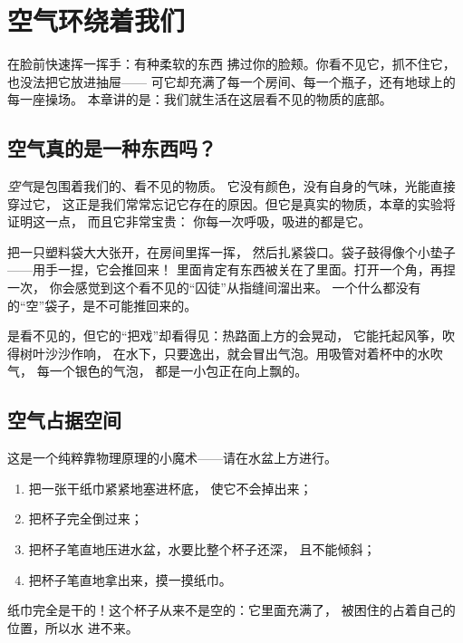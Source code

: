 \chapter{空气环绕着我们}\label{ch:g2:air-around-us}

在脸前快速挥一挥手：有种柔软的东西
拂过你的脸颊。你看不见它，抓不住它，也没法把它放进抽屉——
可它却充满了每一个房间、每一个瓶子，还有地球上的每一座操场。
本章讲的是：我们就生活在这层看不见的物质的底部。

\section{空气真的是一种东西吗？}

\begin{definition}[空气]\label{def:g2:air-around-us:air}
\emph{空气}是包围着我们的、看不见的物质。
它没有颜色，没有自身的气味，光能直接穿过它，
这正是我们常常忘记它存在的原因。但它是真实的物质，本章的实验将证明这一点，
而且它非常宝贵：
你每一次呼吸，吸进的都是它。
\end{definition}

\begin{example}\label{ex:g2:air-around-us:catch}
把一只塑料袋大大张开，在房间里挥一挥，
然后扎紧袋口。袋子鼓得像个小垫子——用手一捏，它会推回来！
里面肯定有东西被关在了里面。打开一个角，再捏一次，
你会感觉到这个看不见的“囚徒”从指缝间溜出来。
一个什么都没有的“空”袋子，是不可能推回来的。
\end{example}

\begin{example}[空气显露自己]\label{ex:g2:air-around-us:shows}
是看不见的，但它的“把戏”却看得见：热路面上方的会晃动，
它能托起风筝，吹得树叶沙沙作响，
在水下，只要逸出，就会冒出气泡。用吸管对着杯中的水吹气，
每一个银色的气泡，
都是一小包正在向上飘的。
\end{example}

\section{空气占据空间}

\begin{method}[干纸巾潜水]\label{met:g2:air-around-us:drytowel}
这是一个纯粹靠物理原理的小魔术——请在水盆上方进行。
\begin{enumerate}
  \item 把一张干纸巾紧紧地塞进杯底，
        使它不会掉出来；
  \item 把杯子完全倒过来；
  \item 把杯子笔直地压进水盆，水要比整个杯子还深，
        且不能倾斜；
  \item 把杯子笔直地拿出来，摸一摸纸巾。
\end{enumerate}
纸巾完全是干的！这个杯子从来不是空的：它里面充满了，
被困住的占着自己的位置，所以水
进不来。
\end{method}

